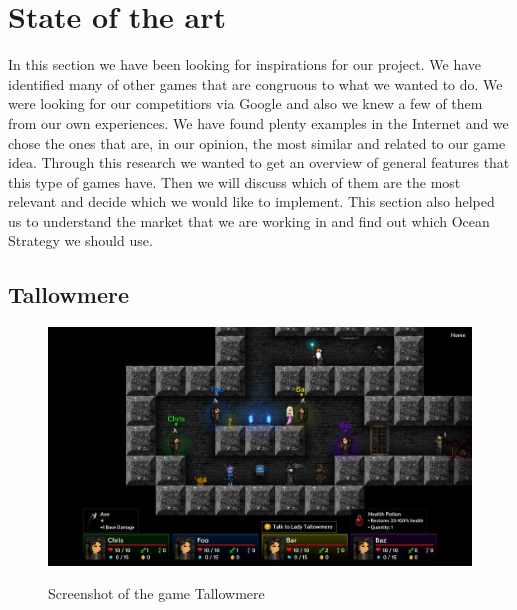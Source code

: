 \documentclass[12p]{article}
\begin{document}

\newpage
\section{State of the art}

In this section we have been looking for inspirations for our project. We have identified many of other games that are congruous to what we wanted to do.
We were looking for our competitiors via Google and also we knew a few of them from our own experiences. We have found plenty examples in the Internet and we chose the ones that are, in our opinion, the most similar and related to our game idea. Through this research we wanted to get an overview of general features that this type of games have. Then we will discuss which of them are the most relevant and decide which we would like to implement. This section also helped us to understand the market that we are working in and find out which Ocean Strategy we should use.


\subsection{Tallowmere} \label{StateOfTheArt_Tallowmere}

\begin{figure}[ht]
    \center
    \includegraphics[width=1\textwidth]{StateOfTheArtScreenshots/tallowmere}
    \label{StateOfTheArt_Screenshots_Tallowmere}
    \caption{Screenshot of the game Tallowmere \cite{TallowmereScreenshot}}
\end{figure}
\end{document}
